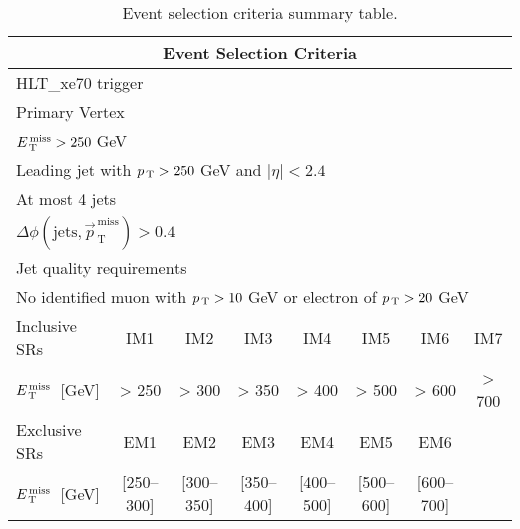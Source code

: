 \begin{table}[!th]
  \centering
  \begin{tabular}{@{}l@{}c@{}c@{}c@{}c@{}c@{}c@{}c}
    \toprule
    \multicolumn{8}{c}{Event Selection Criteria} \\
    \midrule \midrule
    \multicolumn{8}{l}{HLT\_xe70 trigger} \\
    \multicolumn{8}{l}{Primary Vertex} \\
    \multicolumn{8}{l}{$E_\mathrm{\, T}^\mathrm{\, miss} > 250~$GeV} \\
    \multicolumn{8}{l}{Leading jet with $p_\mathrm{\, T} > 250~$GeV and $|\eta| < 2.4$} \\
    \multicolumn{8}{l}{At most 4 jets} \\
    \multicolumn{8}{l}{$\Delta \phi (\mathrm{jets}, \vec{p}_{\mathrm{\,
    T}}^{\mathrm{\, miss}}) > 0.4$} \\
    \multicolumn{8}{l}{Jet quality requirements} \\
    \multicolumn{8}{l}{No identified muon with $p_\mathrm{\, T} > 10~$GeV or electron of
    $p_\mathrm{\, T} > 20~$GeV} \\
    \midrule
    Inclusive SRs & IM1 & IM2 & IM3 & IM4 & IM5 & IM6 & IM7 \\
    $E_\mathrm{\, T}^\mathrm{\, miss}$~[GeV] & > 250 & > 300 & > 350 & > 400 & > 500 & > 600 & > 700 \\
    \midrule
    Exclusive SRs & EM1 & EM2 & EM3 & EM4 & EM5 & EM6 \\
    $E_\mathrm{\, T}^\mathrm{\, miss}$~[GeV] & [250--300] & [300--350] & [350--400] & [400--500] &
    [500--600] & [600--700] \\
    \bottomrule
  \end{tabular}
  \caption{Event selection criteria summary table.}
  \label{tab:event_selection}
\end{table}

